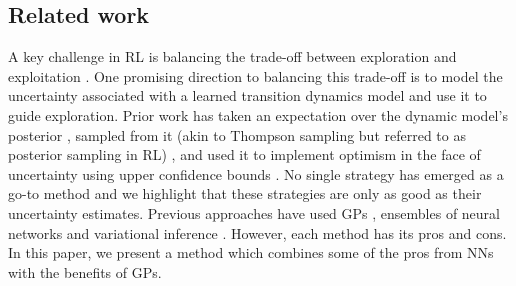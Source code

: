 \documentclass{article} %
\newcommand{\our}{\textsc{sfr}\xspace}
\begin{document}
\subsection{Related work}
A key challenge in RL is balancing the trade-off between exploration and exploitation \cite{sutton2018reinforcement}.
One promising direction to balancing this trade-off is to model the uncertainty associated with a learned transition dynamics model and use it to guide exploration.
Prior work has taken an expectation over the dynamic model's posterior \cite{deisenroth2011pilco,kamtheDataEfficient2018,chuaDeepReinforcementLearning2018},
sampled from it (akin to Thompson sampling but referred to as posterior sampling in RL) \cite{dearden1999model,sasso2023posterior,osbandMoreEfficientReinforcement2013},
and used it to implement optimism in the face of uncertainty using upper confidence bounds \cite{curiEfficient2020,jaksch2010near}.
No single strategy has emerged as a go-to method and we highlight that these strategies are only as good as their uncertainty estimates.
Previous approaches have used GPs \cite{deisenroth2011pilco,kamtheDataEfficient2018},
ensembles of neural networks \cite{curiEfficient2020,chuaDeepReinforcementLearning2018}
and variational inference \cite{galImproving2016,houthooftVIME2017}.
However, each method has its pros and cons.
In this paper, we present a method which combines some of the pros from NNs with the benefits of GPs.

\end{document}
